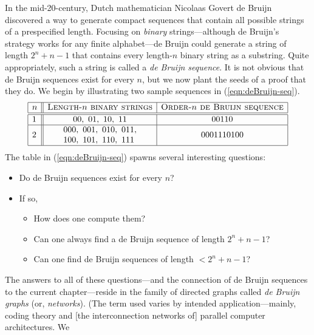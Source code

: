 In the mid-20-century, Dutch mathematician Nicolaas Govert de Bruijn
 discovered a way to generate
compact sequences that contain all possible strings of a prespecified
length.  Focusing on {\em binary} strings---although de Bruijn's
strategy works for any finite alphabet---de Bruijn could generate a
string of length $2^n +n-1$ that contains every length-$n$ binary
string as a substring.  Quite appropriately, such a string is called a
{\it de Bruijn sequence}.  It is not obvious
that de Bruijn sequences exist for every $n$, but we now plant the
seeds of a proof that they do.  We begin by illustrating two sample
sequences in (\ref{eqn:deBruijn-seq}).
\begin{equation}
\label{eqn:deBruijn-seq}
\begin{array}{|l||c|c|}
\hline
n & \mbox{\sc Length-$n$ binary strings}
    & \mbox{\sc Order-$n$ de Bruijn sequence} \\
\hline
\hline
1 &
00, \ 01, \ 10, \ 11  & 00110 \\
\hline
2 &
\begin{array}{l}
000, \ 001, \ 010, \ 011, \\
100, \ 101, \ 110, \ 111 
\end{array}
  & 0001110100 \\
\hline
\end{array}
\end{equation}
The table in (\ref{eqn:deBruijn-seq}) spawns several interesting
questions:
\begin{itemize}
\item
Do de Bruijn sequences exist for every $n$?
\item
If so, 
  \begin{itemize}
  \item
How does one compute them?
  \item
Can one always find a de Bruijn sequence of length $2^n +n-1$?
  \item
Can one find de Bruijn sequences of length $< 2^n +n-1$?
  \end{itemize}
\end{itemize}
The answers to all of these questions---and the connection of de
Bruijn sequences to the current chapter---reside in the family of
directed graphs called {\it de Bruijn graphs} (or, {\it networks}).
  (The term used
varies by intended application---mainly, coding theory and [the
  interconnection networks of] parallel computer architectures.  We
